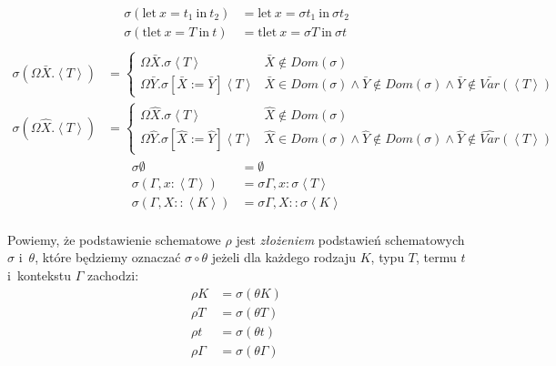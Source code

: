 \documentclass[11pt,leqno]{article}
\begin{document}
\begin{definicja}
\begin{align*}
\sigma (\textrm{let} \ x = t_1 \ \textrm{in} \ t_2) & = \textrm{let} \ x = \sigma t_1 \ \textrm{in} \ \sigma t_2 \\
\sigma (\textrm{tlet} \ x = T \ \textrm{in} \ t) & = \textrm{tlet} \ x = \sigma T \ \textrm{in} \ \sigma t \\
\end{align*}
\begin{align*}
\sigma (\Omega\bar{X}.\left<T\right>) & =
	\begin{cases}
		\Omega\bar{X}.\sigma\left<T\right> & \bar{X} \notin Dom(\sigma) \\
		\Omega\bar{Y}.\sigma[\bar{X}:=\bar{Y}]\left<T\right> & \bar{X} \in Dom(\sigma) \land \bar{Y} \notin Dom(\sigma) \land \bar{Y} \notin \bar{Var}(\left<T\right>)
	\end{cases} \\
\sigma (\Omega\widehat{X}.\left<T\right>) & =
	\begin{cases}
		\Omega\widehat{X}.\sigma\left<T\right> & \widehat{X} \notin Dom(\sigma) \\
		\Omega\widehat{Y}.\sigma[\widehat{X}:=\widehat{Y}]\left<T\right> & \widehat{X} \in Dom(\sigma) \land \widehat{Y} \notin Dom(\sigma) \land \widehat{Y} \notin \widehat{Var}(\left<T\right>)
	\end{cases}
\end{align*}
\begin{align*}
\sigma \emptyset & = \emptyset \\
\sigma (\Gamma, x : \left<T\right>) & = \sigma \Gamma, x : \sigma \left<T\right> \\
\sigma (\Gamma, X :: \left<K\right>) & = \sigma \Gamma, X :: \sigma \left<K\right> \\
\end{align*}
\end{definicja}

\begin{definicja}
Powiemy, że podstawienie schematowe $\rho$ jest \emph{złożeniem} podstawień schematowych $\sigma$ i~$\theta$, 
które będziemy oznaczać $\sigma\circ\theta$ jeżeli
dla każdego rodzaju $K$, typu $T$, termu $t$ i~kontekstu $\Gamma$ zachodzi:
\begin{align*}
\rho K & = \sigma(\theta K) \\
\rho T & = \sigma(\theta T) \\
\rho t & = \sigma(\theta t) \\
\rho \Gamma & = \sigma(\theta \Gamma)
\end{align*}
\end{definicja}
\end{document}
